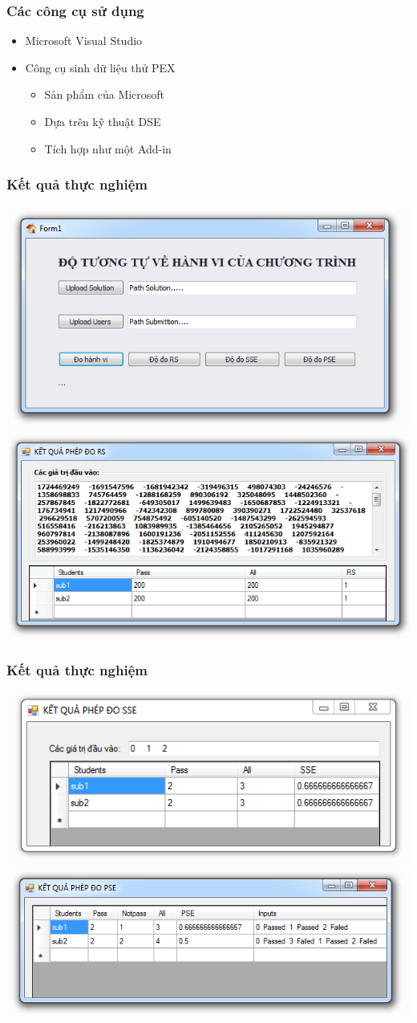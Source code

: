 \documentclass{beamer}
\begin{document}
\begin{frame}
  \frametitle{Các công cụ sử dụng}
  \begin{itemize}
  	\item Microsoft Visual Studio
  	\item Công cụ sinh dữ liệu thử PEX
  	\begin{itemize}
  		\item Sản phẩm của Microsoft
  		\item Dựa trên kỹ thuật DSE
  		\item Tích hợp như một Add-in
  	\end{itemize}
  \end{itemize}
\end{frame}


\begin{frame}
  \frametitle{Kết quả thực nghiệm}
  \centering
  \includegraphics[width=0.6\linewidth]{images/main.png} \\
  \includegraphics[width=0.6\linewidth]{images/kq_rs.png}
\end{frame}

\begin{frame}
  \frametitle{Kết quả thực nghiệm}
\centering
\includegraphics[width=0.8\linewidth]{images/kq_sse.png} \\
\includegraphics[width=0.8\linewidth]{images/kq_pse.png}
\end{frame}
\end{document}
